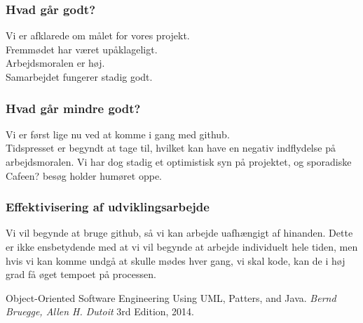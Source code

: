 \documentclass[11pt]{article}
\begin{document}
\subsubsection{Hvad går godt?}
Vi er afklarede om målet for vores projekt.\\
Fremmødet har været upåklageligt.\\
Arbejdsmoralen er høj.\\
Samarbejdet fungerer stadig godt.
\subsubsection{Hvad går mindre godt?}
Vi er først lige nu ved at komme i gang med github.\\
Tidspresset er begyndt at tage til, hvilket kan have en negativ indflydelse på arbejdsmoralen. Vi har dog stadig et optimistisk syn på projektet, og sporadiske Cafeen? besøg holder humøret oppe.
\subsubsection{Effektivisering af udviklingsarbejde}
Vi vil begynde at bruge github, så vi kan arbejde uafhængigt af hinanden. Dette er ikke ensbetydende med at vi vil begynde at arbejde individuelt hele tiden, men hvis vi kan komme undgå at skulle mødes hver gang, vi skal kode, kan de i høj grad få øget tempoet på processen.
\begin{thebibliography}{9}

  Object-Oriented Software Engineering Using UML, Patters, and Java.
  \emph{Bernd Bruegge, Allen H. Dutoit}
  3rd Edition,
  2014.


\end{thebibliography}
\end{document}
